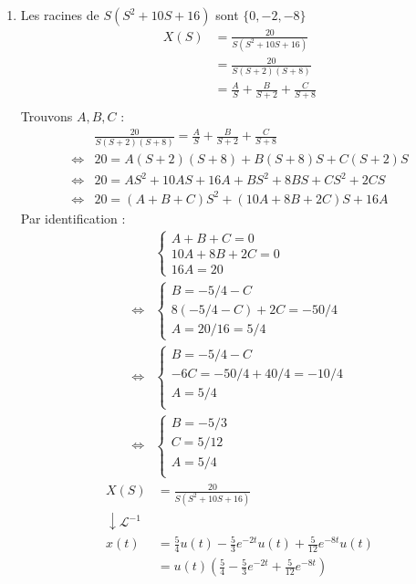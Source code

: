 \documentclass{article}
\theoremstyle{plain}%
\theoremstyle{definition}
\theoremstyle{remark}
\begin{document}
\begin{enumerate}
    \item Les racines de $ S(S^2 + 10S + 16) $ sont $ \{0, -2, -8\} $ 
    \begin{align*}
        X(S) &= \frac{20}{S(S^2 + 10S + 16)} \\
            &= \frac{20}{S(S+2)(S+8)} \\
            &= \frac{A}{S} + \frac{B}{S+2} + \frac{C}{S+8} \\
    \end{align*}
    Trouvons $ A, B, C $ : 
    \begin{align*}
        &\frac{20}{S(S+2)(S+8)} = \frac{A}{S} + \frac{B}{S+2} + \frac{C}{S+8} \\
        \Leftrightarrow & 20 = A(S+2)(S+8) + B(S+8)S + C(S+2)S \\ 
        \Leftrightarrow & 20 = AS^2 + 10AS + 16A + BS^2 + 8BS + CS^2 + 2CS \\
        \Leftrightarrow & 20 = (A + B + C)S^2 + (10A + 8B + 2C)S + 16A
    \end{align*}
    Par identification : 
    \begin{align*}
        &\begin{cases}
            A + B + C = 0 \\
            10A + 8B + 2C = 0 \\
            16A = 20
        \end{cases} \\
        \Leftrightarrow &
        \begin{cases}
            B = -5/4 - C \\
            8(-5/4 - C) + 2C = -50/4 \\
            A = 20/16 = 5/4
        \end{cases} \\
        \Leftrightarrow &
        \begin{cases}
            B = -5/4 - C \\
            -6C = -50/4 + 40/4 = -10/4 \\
            A = 5/4 \\
        \end{cases} \\
        \Leftrightarrow &
        \begin{cases}
            B = -5/3 \\
            C = 5/12 \\
            A = 5/4 \\
        \end{cases}
    \end{align*}
    \begin{align*}
        X(S) &= \frac{20}{S(S^2 + 10S + 16)}\\
        \downarrow \mathcal{L}^{-1}& \\
        x(t) &= \frac{5}{4}u(t) - \frac{5}{3}e^{-2t}u(t) + \frac{5}{12}e^{-8t}u(t) \\
            &= u(t)(\frac{5}{4} - \frac{5}{3}e^{-2t} + \frac{5}{12}e^{-8t})
    \end{align*}
\end{enumerate}
\end{document}
